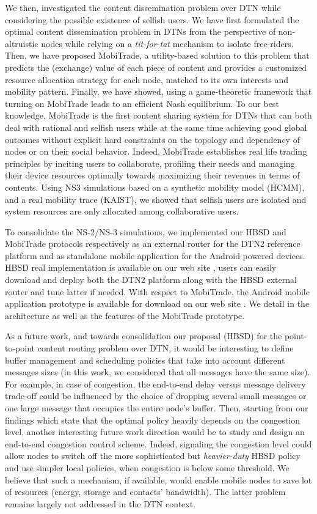 We then, investigated the content dissemination problem over DTN while considering the possible existence of selfish users. We have first formulated the optimal content dissemination problem in DTNs from the perspective of non-altruistic nodes while relying on a \emph{tit-for-tat} mechanism to isolate free-riders. Then, we have proposed MobiTrade, a utility-based solution to this problem that predicts the (exchange) value of each piece of content and provides a customized resource allocation strategy for each node, matched to its own interests and mobility pattern. Finally, we have showed, using a game-theoretic framework that turning on MobiTrade leads to an efficient Nash equilibrium. To our best knowledge, MobiTrade is the first content sharing
system for DTNs that can both deal with rational and selfish users while at the same time achieving good global outcomes
without explicit hard constraints on the topology and dependency of nodes or on their social behavior. Indeed, MobiTrade establishes real life trading principles by inciting users to collaborate, profiling their needs and managing their device resources optimally towards maximizing their revenues in terms of contents. Using NS3 simulations based on a synthetic mobility model (HCMM), and a real mobility trace (KAIST), we showed that selfish users are isolated and system resources are only allocated among collaborative users. 

To consolidate the NS-2/NS-3 simulations, we implemented our HBSD and MobiTrade protocols respectively as an external router for the DTN2 reference platform and as standalone mobile application for the Android powered devices. HBSD real implementation is available on our web site \cite{HBSDDTN2}, users can easily download and deploy both the DTN2 platform along with the HBSD external router and tune latter if needed. With respect to MobiTrade, the Android mobile application prototype is available for download on our web site \cite{MobiTradeAndroid}. We detail in \cite{MobiTradeAndroid} the architecture as well as the features of the MobiTrade prototype. 

As a future work, and towards consolidation our proposal (HBSD) for the point-to-point content routing problem over DTN, it would be interesting to define buffer management and scheduling policies that take into account different messages sizes (in this work, we considered that all messages have the same size). For example, in case of congestion, the end-to-end delay versus message delivery trade-off could be influenced by the choice of dropping several small messages or one large message that occupies the entire node's buffer. Then, starting from our findings which state that 
the optimal policy heavily depends on the congestion level, another interesting future work direction would be to study and design an end-to-end congestion control scheme. Indeed, signaling the congestion level could allow nodes to switch off the more sophisticated but \emph{heavier-duty} HBSD policy and use simpler local policies, when congestion is below
some threshold. We believe that such a mechanism, if available, would enable mobile nodes to save lot of resources (energy, storage and contacts' bandwidth). The latter problem remains largely not addressed in the DTN context.

